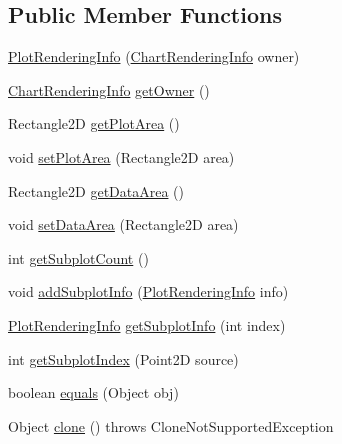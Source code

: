 \subsection*{Public Member Functions}
\begin{DoxyCompactItemize}
\item 
\mbox{\hyperlink{classorg_1_1jfree_1_1chart_1_1plot_1_1_plot_rendering_info_a7b0efc76e217c7e76625dc4852f40cd2}{Plot\+Rendering\+Info}} (\mbox{\hyperlink{classorg_1_1jfree_1_1chart_1_1_chart_rendering_info}{Chart\+Rendering\+Info}} owner)
\item 
\mbox{\hyperlink{classorg_1_1jfree_1_1chart_1_1_chart_rendering_info}{Chart\+Rendering\+Info}} \mbox{\hyperlink{classorg_1_1jfree_1_1chart_1_1plot_1_1_plot_rendering_info_a9410ad200dac0113cf8ab35365227541}{get\+Owner}} ()
\item 
Rectangle2D \mbox{\hyperlink{classorg_1_1jfree_1_1chart_1_1plot_1_1_plot_rendering_info_aeba057ee7d70678df2f7f88314de2d69}{get\+Plot\+Area}} ()
\item 
void \mbox{\hyperlink{classorg_1_1jfree_1_1chart_1_1plot_1_1_plot_rendering_info_ade390a6d8612deaded6505d39cb2d0ac}{set\+Plot\+Area}} (Rectangle2D area)
\item 
Rectangle2D \mbox{\hyperlink{classorg_1_1jfree_1_1chart_1_1plot_1_1_plot_rendering_info_a1dc9b2a8f70081daab3309ff46747dfd}{get\+Data\+Area}} ()
\item 
void \mbox{\hyperlink{classorg_1_1jfree_1_1chart_1_1plot_1_1_plot_rendering_info_a0b5df4dec91b5707b3571df045d6aee9}{set\+Data\+Area}} (Rectangle2D area)
\item 
int \mbox{\hyperlink{classorg_1_1jfree_1_1chart_1_1plot_1_1_plot_rendering_info_a7768ec5686a73938d8a3aca312e52fa6}{get\+Subplot\+Count}} ()
\item 
void \mbox{\hyperlink{classorg_1_1jfree_1_1chart_1_1plot_1_1_plot_rendering_info_a542c06a11a1bd07904e79644745ebb61}{add\+Subplot\+Info}} (\mbox{\hyperlink{classorg_1_1jfree_1_1chart_1_1plot_1_1_plot_rendering_info}{Plot\+Rendering\+Info}} info)
\item 
\mbox{\hyperlink{classorg_1_1jfree_1_1chart_1_1plot_1_1_plot_rendering_info}{Plot\+Rendering\+Info}} \mbox{\hyperlink{classorg_1_1jfree_1_1chart_1_1plot_1_1_plot_rendering_info_a5ed7e19543067de91316df65cd079f53}{get\+Subplot\+Info}} (int index)
\item 
int \mbox{\hyperlink{classorg_1_1jfree_1_1chart_1_1plot_1_1_plot_rendering_info_aeaedb746d2b0ac4712620f12e82c0afa}{get\+Subplot\+Index}} (Point2D source)
\item 
boolean \mbox{\hyperlink{classorg_1_1jfree_1_1chart_1_1plot_1_1_plot_rendering_info_a674370bbb73a8b89d31d199ae67b4e69}{equals}} (Object obj)
\item 
Object \mbox{\hyperlink{classorg_1_1jfree_1_1chart_1_1plot_1_1_plot_rendering_info_a59e8a96b0d4e96422e505cd774932308}{clone}} ()  throws Clone\+Not\+Supported\+Exception 
\end{DoxyCompactItemize}


